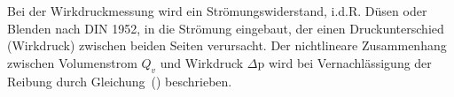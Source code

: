 Bei der Wirkdruckmessung wird ein Strömungswiderstand, i.d.R. Düsen oder Blenden nach DIN 1952, in die Strömung eingebaut, der einen Druckunterschied (Wirkdruck) zwischen beiden Seiten verursacht. Der nichtlineare Zusammenhang zwischen Volumenstrom $Q_v$ und Wirkdruck $\Delta$p wird bei Vernachlässigung der Reibung durch Gleichung~() beschrieben.